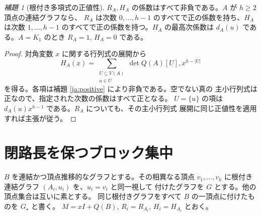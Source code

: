 \documentclass[12pt]{amsart}
\theoremstyle{definition}
\theoremstyle{remark}
\numberwithin{equation}{section}
\newtheorem{jlem}[thm]{補題}
\begin{document}
\begin{jlem}[根付き多項式の正値性]\label{ja:rooted}
$R_A,H_A$ の係数はすべて非負である。$A$ が $h\ge2$ 頂点の連結グラフなら、
$R_A$ は次数 $0,\ldots,h-1$ のすべてで正の係数を持ち、$H_A$ は次数
$1,\ldots,h-1$ のすべてで正の係数を持つ。$H_A$ の最高次係数は $d_A(u)$
である。$A=K_1$ のとき $R_A=1$, $H_A=0$ である。
\end{jlem}
\begin{proof}
対角変数 $x$ に関する行列式の展開から
\[
 H_A(x)=\sum_{\substack{U\subseteq V(A)\\u\in U}}
        \det Q(A)[U],x^{h-|U|}
\]
を得る。各項は補題 \ref{ja:positive} により非負である。空でない真の
主小行列式は正なので、指定された次数の係数はすべて正となる。
$U=\{u\}$ の項は $d_A(u)x^{h-1}$ である。$R_A$ についても、その主小行列式
展開に同じ正値性を適用すれば主張が従う。
\end{proof}

\section{閉路長を保つブロック集中}
$B$ を連結かつ頂点推移的なグラフとする。その相異なる頂点
$v_1,\ldots,v_h$ に根付き連結グラフ $(A_i,u_i)$ を、$u_i=v_i$ と同一視して
付けたグラフを $G$ とする。他の頂点集合は互いに素とする。
同じ根付きグラフをすべて $B$ の一頂点に付けたものを $G_\star$ と書く。
$M=xI+Q(B)$, $R_i=R_{A_i}$, $H_i=H_{A_i}$ とおく。
\end{document}
